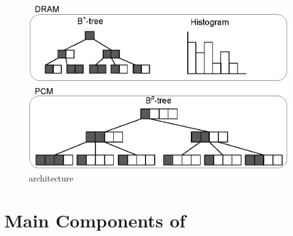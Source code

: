 


\begin{figure}[!t]
\centering
\includegraphics[scale=0.75]{figs/archi.eps}
\caption{\bptree architecture}
\label{fig:archi}
\end{figure}








\section{Main Components of {\large \bptree}}
\label{sec:algorithm}

